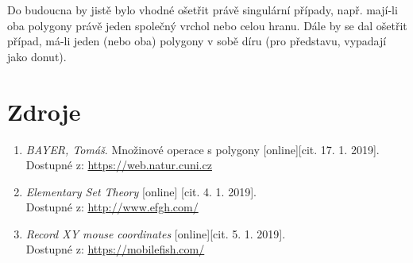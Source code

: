 \documentclass[a4paper, 12pt]{article}
\begin{document}
Do budoucna by jistě bylo vhodné ošetřit právě singulární případy, např. mají-li oba polygony právě jeden společný vrchol nebo celou hranu. Dále by se dal ošetřit případ, má-li jeden (nebo oba) polygony v sobě díru (pro představu, vypadají jako donut).
\clearpage

\section{Zdroje}
\begin{enumerate}
\item  \textsl{BAYER, Tomáš}. Množinové operace s polygony [online][cit. 17. 1. 2019].\\
Dostupné z: \href{https://web.natur.cuni.cz/~bayertom/images/courses/Adk/adk9.pdf}{https://web.natur.cuni.cz}

\item  \textsl{Elementary Set Theory} [online] [cit. 4. 1. 2019].\\
Dostupné z: \href{http://www.efgh.com/math/algebra/sets.htm}{http://www.efgh.com/}

\item \textsl{Record XY mouse coordinates} [online][cit. 5. 1. 2019].\\
Dostupné z: \href{https://mobilefish.com/services/record_mouse_coordinates/record_mouse_coordinates.php}{https://mobilefish.com/}\\
\end{enumerate}
\end{document}
